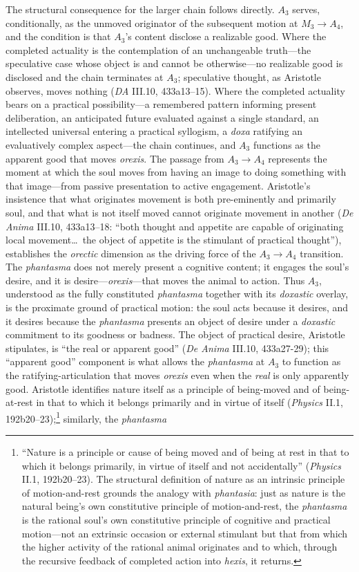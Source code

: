 The structural consequence for the larger chain follows directly. $A_3$ serves, conditionally, as the unmoved originator of the subsequent motion at $M_3 \rightarrow A_4$, and the condition is that $A_3$'s content disclose a realizable good. Where the completed actuality is the contemplation of an unchangeable truth---the speculative case whose object is and cannot be otherwise---no realizable good is disclosed and the chain terminates at $A_3$; speculative thought, as Aristotle observes, moves nothing (\textit{DA} III.10, 433a13--15). Where the completed actuality bears on a practical possibility---a remembered pattern informing present deliberation, an anticipated future evaluated against a single standard, an intellected universal entering a practical syllogism, a \textit{doxa} ratifying an evaluatively complex aspect---the chain continues, and $A_3$ functions as the apparent good that moves \textit{orexis}. The passage from $A_3 \to A_4$ represents the moment at which the soul moves from having an image to doing something with that image---from passive presentation to active engagement. Aristotle's insistence that what originates movement is both pre-eminently and primarily soul, and that what is not itself moved cannot originate movement in another (\textit{De Anima} III.10, 433a13--18: ``both thought and appetite are capable of originating local movement\ldots\ the object of appetite is the stimulant of practical thought''), establishes the \textit{orectic} dimension as the driving force of the $A_3 \to A_4$ transition. The \textit{phantasma} does not merely present a cognitive content; it engages the soul's desire, and it is desire---\textit{orexis}---that moves the animal to action. Thus $A_3$, understood as the fully constituted \textit{phantasma} together with its \textit{doxastic} overlay, is the proximate ground of practical motion: the soul acts because it desires, and it desires because the \textit{phantasma} presents an object of desire under a \textit{doxastic} commitment to its goodness or badness. The object of practical desire, Aristotle stipulates, is ``the real or apparent good'' (\textit{De Anima} III.10, 433a27-29); this ``apparent good'' component is what allows the \textit{phantasma} at $A_3$ to function as the ratifying-articulation that moves \textit{orexis} even when the \textit{real} is only apparently good. Aristotle identifies nature itself as a principle of being-moved and of being-at-rest in that to which it belongs primarily and in virtue of itself (\textit{Physics} II.1, 192b20--23);\footnote{``Nature is a principle or cause of being moved and of being at rest in that to which it belongs primarily, in virtue of itself and not accidentally'' (\textit{Physics} II.1, 192b20--23). The structural definition of nature as an intrinsic principle of motion-and-rest grounds the analogy with \textit{phantasia}: just as nature is the natural being's own constitutive principle of motion-and-rest, the \textit{phantasma} is the rational soul's own constitutive principle of cognitive and practical motion---not an extrinsic occasion or external stimulant but that from which the higher activity of the rational animal originates and to which, through the recursive feedback of completed action into \textit{hexis}, it returns.} similarly, the \textit{phantasma} 